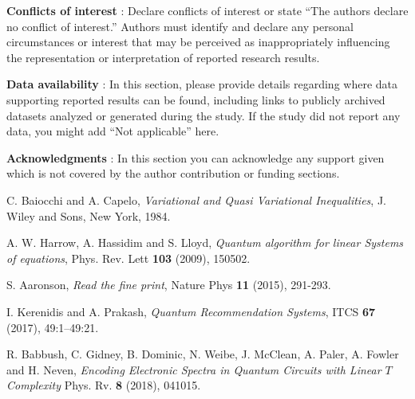 \documentclass[10pt,twoside,reqno]{amsart} %
\theoremstyle{plain}
\theoremstyle{definition}
\begin{document}



\bigskip
{\bf Conflicts of interest} : {Declare conflicts of interest or state ``The authors declare no conflict of interest.'' Authors must identify and declare any personal circumstances or interest that may be perceived as inappropriately influencing the representation or interpretation of reported research results.} 

\bigskip
{\bf Data availability} : {In this section, please provide details regarding where data supporting reported results can be found, including links to publicly archived datasets analyzed or generated during the study. If the study did not report any data, you might add ``Not applicable'' here.} 

\bigskip
{\bf Acknowledgments} : {In this section you can acknowledge any support given which is not covered by the author contribution or funding sections.}


\bigskip

C. Baiocchi and A. Capelo, 
{\it Variational and Quasi Variational Inequalities}, 
J. Wiley and Sons, 
New York, 
1984.

A. W. Harrow, A. Hassidim and S. Lloyd,
{\it Quantum algorithm for linear Systems of equations},
Phys. Rev. Lett
{\bf 103} (2009),
150502.

S. Aaronson,
{\it Read the fine print},
Nature Phys
{\bf 11} (2015),
291-293.

I. Kerenidis and A. Prakash,
{\it Quantum Recommendation Systems},
ITCS
{\bf 67} (2017),
49:1--49:21.

R. Babbush, C. Gidney, B. Dominic, N. Weibe, J. McClean, A. Paler, A. Fowler
and H. Neven,
{\it Encoding Electronic Spectra in Quantum Circuits with Linear $T$ Complexity}
Phys. Rv.
{\bf 8} (2018),
041015.
\end{document}
